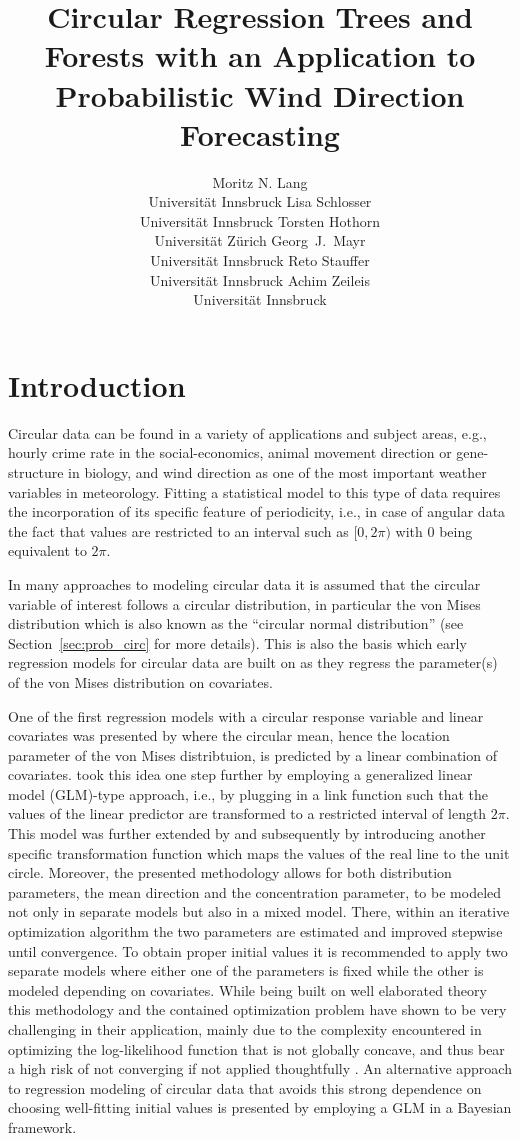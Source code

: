 \documentclass[nojss]{jss}
\title{Circular Regression Trees and Forests with an Application to 
    Probabilistic Wind Direction Forecasting}
\author{Moritz N. Lang\\Universit\"at Innsbruck
   \And Lisa Schlosser\\Universit\"at Innsbruck
   \And Torsten Hothorn\\Universit\"at Z\"urich
   \AND Georg~J.~Mayr\\Universit\"at Innsbruck
   \And Reto Stauffer\\Universit\"at Innsbruck
   \And Achim Zeileis\\Universit\"at Innsbruck}
\numberwithin{equation}{section}
\begin{document}
\section{Introduction}
\label{sec:introduction}

Circular data can be found in a variety of applications and subject areas, 
e.g., hourly crime rate in the social-economics, animal movement direction or 
gene-structure in biology, and wind direction as one of the most important weather 
variables in meteorology. Fitting a statistical model to this type of data requires
the incorporation of its specific feature of periodicity, i.e., in case of angular
data the fact that values are restricted to an interval such as $[0,2\pi)$ with
$0$ being equivalent to $2\pi$.

In many approaches to modeling circular data it is assumed that the circular variable of interest 
follows a circular distribution, in particular the von Mises distribution which is also known 
as the ``circular normal distribution'' (see Section~\ref{sec:prob_circ} for more details). 
This is also the basis which early regression models for circular data are built on as they 
regress the parameter(s) of the von Mises distribution on covariates.

One of the first regression models with a circular response variable and linear covariates
was presented by \cite{Gould:1969} where the circular mean, hence the location parameter of 
the von Mises distribtuion, is predicted by a linear combination of covariates.
\cite{Johnson+Wehrly:1978} took this idea one step further by employing a generalized linear 
model (GLM)-type approach, i.e., by plugging in a link function such that the values of the 
linear predictor are transformed to a restricted interval of length $2\pi$. 
This model was further extended by \cite{Fisher+Lee:1992} and subsequently by \cite{Fisher:1993} 
introducing another specific transformation function which maps the values of the real line to the 
unit circle. Moreover, the presented methodology allows for both distribution parameters, the mean direction and the concentration parameter, to be modeled not only in separate models but also in a 
mixed model. There, within an iterative optimization algorithm the two parameters are estimated and 
improved stepwise until convergence. To obtain proper initial values it is recommended to apply
two separate models where either one of the parameters is fixed while the other is modeled depending
on covariates. While being built on well elaborated theory this methodology and the contained 
optimization problem have shown to be very challenging in their application, mainly due to the 
complexity encountered in optimizing the log-likelihood function that is not globally concave, 
and thus bear a high risk of not converging if not applied thoughtfully 
\citep{Pewsey+Neuhaeuser+Ruxton:2013, Gill+Hangartner:2010}.
An alternative approach to regression modeling of circular data that avoids this strong dependence 
on choosing well-fitting initial values is presented by \cite{Mulder+Klugkist:2017} employing a GLM 
in a Bayesian framework. 
\end{document}
